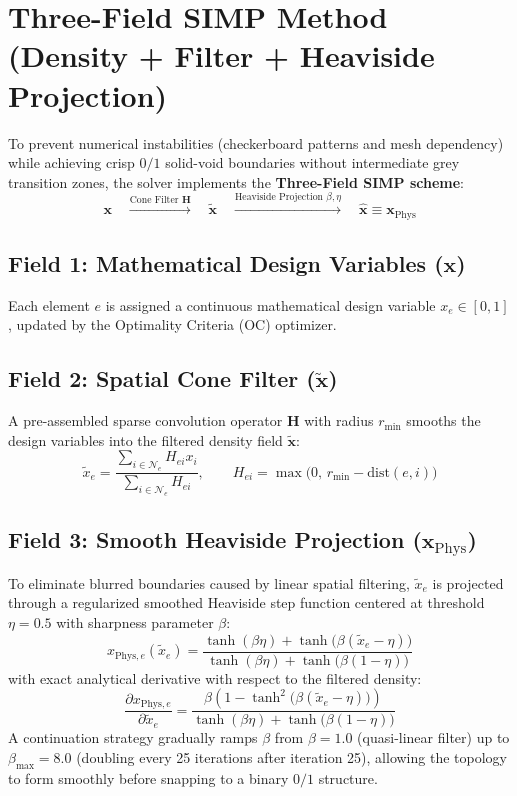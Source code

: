 \documentclass[11pt, a4paper]{article}
\begin{document}
\section{Three-Field SIMP Method (Density + Filter + Heaviside Projection)}
To prevent numerical instabilities (checkerboard patterns and mesh dependency) while achieving crisp $0/1$ solid-void boundaries without intermediate grey transition zones, the solver implements the \textbf{Three-Field SIMP scheme}:
\begin{equation}
    \mathbf{x} \quad \xrightarrow{\text{Cone Filter } \mathbf{H}} \quad \tilde{\mathbf{x}} \quad \xrightarrow{\text{Heaviside Projection } \beta, \eta} \quad \hat{\mathbf{x}} \equiv \mathbf{x}_{\text{Phys}}
\end{equation}

\subsection{Field 1: Mathematical Design Variables ($\mathbf{x}$)}
Each element $e$ is assigned a continuous mathematical design variable $x_e \in [0, 1]$, updated by the Optimality Criteria (OC) optimizer.

\subsection{Field 2: Spatial Cone Filter ($\tilde{\mathbf{x}}$)}
A pre-assembled sparse convolution operator $\mathbf{H}$ with radius $r_{\min}$ smooths the design variables into the filtered density field $\tilde{\mathbf{x}}$:
\begin{equation}
    \tilde{x}_e = \frac{\sum_{i \in \mathcal{N}_e} H_{ei} x_i}{\sum_{i \in \mathcal{N}_e} H_{ei}}, \qquad H_{ei} = \max\big(0,\, r_{\min} - \text{dist}(e, i)\big)
\end{equation}

\subsection{Field 3: Smooth Heaviside Projection ($\mathbf{x}_{\text{Phys}}$)}
To eliminate blurred boundaries caused by linear spatial filtering, $\tilde{x}_e$ is projected through a regularized smoothed Heaviside step function centered at threshold $\eta = 0.5$ with sharpness parameter $\beta$:
\begin{equation}
    x_{\text{Phys}, e}(\tilde{x}_e) = \frac{\tanh(\beta \eta) + \tanh\!\big(\beta (\tilde{x}_e - \eta)\big)}{\tanh(\beta \eta) + \tanh\!\big(\beta (1 - \eta)\big)}
\end{equation}
with exact analytical derivative with respect to the filtered density:
\begin{equation}
    \frac{\partial x_{\text{Phys}, e}}{\partial \tilde{x}_e} = \frac{\beta \left(1 - \tanh^2\!\big(\beta (\tilde{x}_e - \eta)\big)\right)}{\tanh(\beta \eta) + \tanh\!\big(\beta (1 - \eta)\big)}
\end{equation}
A continuation strategy gradually ramps $\beta$ from $\beta = 1.0$ (quasi-linear filter) up to $\beta_{\max} = 8.0$ (doubling every 25 iterations after iteration 25), allowing the topology to form smoothly before snapping to a binary $0/1$ structure.
\end{document}
